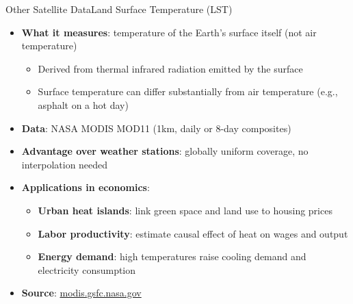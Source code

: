 \documentclass[dvipsnames,hyperref={pdfpagelabels=false}]{beamer}
\begin{document}
\begin{frame}{Other Satellite Data}{Land Surface Temperature (LST)}
\begin{itemize}
    \item \textbf{What it measures}: temperature of the Earth's surface 
    itself (not air temperature)
    \vspace{0.2cm}
    \begin{itemize}
        \item Derived from thermal infrared radiation emitted by the surface
        \vspace{0.1cm}
        \item Surface temperature can differ substantially from 
        air temperature (e.g., asphalt on a hot day)
    \end{itemize}
    \vspace{0.2cm}
    \item \textbf{Data}: NASA MODIS MOD11 (1km, daily or 8-day composites)
    \vspace{0.2cm}
    \item \textbf{Advantage over weather stations}: 
    globally uniform coverage, no interpolation needed
    \vspace{0.2cm}
    \item \textbf{Applications in economics}:
    \vspace{0.1cm}
    \begin{itemize}
        \item \textbf{Urban heat islands}: link green space and 
        land use to housing prices
        \vspace{0.1cm}
        \item \textbf{Labor productivity}: estimate causal effect 
        of heat on wages and output
        \vspace{0.1cm}
        \item \textbf{Energy demand}: high temperatures raise 
        cooling demand and electricity consumption
    \end{itemize}
    \vspace{0.2cm}
    \item \textbf{Source}: 
    \href{https://modis.gsfc.nasa.gov/data/dataprod/}{modis.gsfc.nasa.gov}
\end{itemize}
\end{frame}
\end{document}
